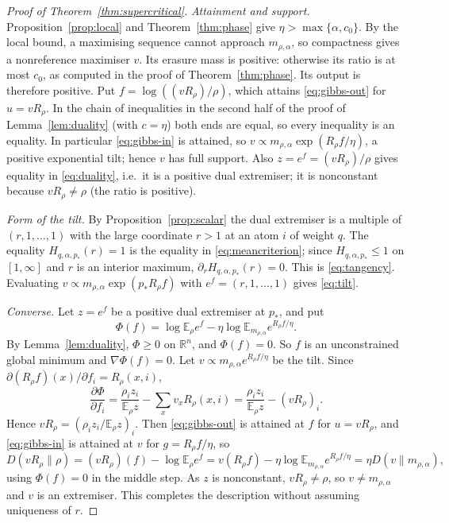 \documentclass[11pt,a4paper]{article}
\numberwithin{equation}{section}
\theoremstyle{definition}
\theoremstyle{remark}
\newcommand{\KL}{D}
\newcommand{\E}{\mathbb E}
\newcommand{\R}{\mathbb R}
\newcommand{\mra}{m_{\rho,\alpha}}
\begin{document}
\begin{proof}[Proof of Theorem~\ref{thm:supercritical}]
\emph{Attainment and support.} Proposition~\ref{prop:local} and
Theorem~\ref{thm:phase} give \(\eta>\max\{\alpha,c_0\}\). By the local
bound, a maximising sequence cannot approach \(\mra\), so compactness gives
a nonreference maximiser \(v\). Its erasure mass is positive: otherwise its
ratio is at most \(c_0\), as computed in the proof of
Theorem~\ref{thm:phase}. Its output is therefore positive. Put
\(f=\log((vR_\rho)/\rho)\), which attains \eqref{eq:gibbs-out} for
\(u=vR_\rho\). In the chain of inequalities in the second half of the
proof of Lemma~\ref{lem:duality} (with \(c=\eta\)) both ends are equal, so
every inequality is an equality. In particular \eqref{eq:gibbs-in} is
attained, so \(v\propto\mra\exp(R_\rho f/\eta)\), a positive exponential
tilt; hence \(v\) has full support. Also \(z=e^f=(vR_\rho)/\rho\) gives
equality in \eqref{eq:duality}, i.e.\ it is a positive dual extremiser; it
is nonconstant because \(vR_\rho\ne\rho\) (the ratio is positive).

\emph{Form of the tilt.} By Proposition~\ref{prop:scalar} the dual
extremiser is a multiple of \((r,1,\ldots,1)\) with the large coordinate
\(r>1\) at an atom \(i\) of weight \(q\). The equality
\(H_{q,\alpha,p_*}(r)=1\) is the equality in \eqref{eq:meancriterion}; since
\(H_{q,\alpha,p_*}\le1\) on \([1,\infty]\) and \(r\) is an interior
maximum, \(\partial_rH_{q,\alpha,p_*}(r)=0\). This is \eqref{eq:tangency}.
Evaluating \(v\propto\mra\exp(p_*R_\rho f)\) with \(e^{f}=(r,1,\ldots,1)\)
gives \eqref{eq:tilt}.

\emph{Converse.} Let \(z=e^{f}\) be a positive dual extremiser at
\(p_*\), and put
\[
\Phi(f)=\log\E_\rho e^{f}-\eta\log\E_{\mra}e^{R_\rho f/\eta}.
\]
By Lemma~\ref{lem:duality}, \(\Phi\ge0\) on \(\R^n\), and \(\Phi(f)=0\).
So \(f\) is an unconstrained global minimum and \(\nabla\Phi(f)=0\). Let
\(v\propto\mra e^{R_\rho f/\eta}\) be the tilt. Since
\(\partial(R_\rho f)(x)/\partial f_i=R_\rho(x,i)\),
\[
\frac{\partial\Phi}{\partial f_i}
=\frac{\rho_iz_i}{\E_\rho z}-\sum_xv_xR_\rho(x,i)
=\frac{\rho_iz_i}{\E_\rho z}-(vR_\rho)_i .
\]
Hence \(vR_\rho=(\rho_iz_i/\E_\rho z)_i\). Then \eqref{eq:gibbs-out} is
attained at \(f\) for \(u=vR_\rho\), and \eqref{eq:gibbs-in} is attained at
\(v\) for \(g=R_\rho f/\eta\), so
\[
\KL(vR_\rho\|\rho)=(vR_\rho)(f)-\log\E_\rho e^f
=v(R_\rho f)-\eta\log\E_{\mra}e^{R_\rho f/\eta}=\eta\KL(v\|\mra),
\]
using \(\Phi(f)=0\) in the middle step. As \(z\) is nonconstant,
\(vR_\rho\ne\rho\), so \(v\ne\mra\) and \(v\) is an extremiser. This
completes the description without assuming uniqueness of \(r\).
\end{proof}
\end{document}
